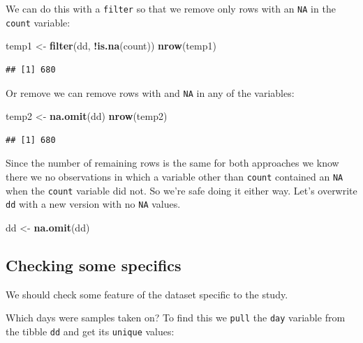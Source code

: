 \documentclass[]{book}
\newenvironment{Shaded}{\begin{snugshade}}{\end{snugshade}}
\newcommand{\KeywordTok}[1]{\textcolor[rgb]{0.13,0.29,0.53}{\textbf{#1}}}
\newcommand{\NormalTok}[1]{#1}
\newcommand{\OperatorTok}[1]{\textcolor[rgb]{0.81,0.36,0.00}{\textbf{#1}}}
\newcommand{\StringTok}[1]{\textcolor[rgb]{0.31,0.60,0.02}{#1}}
\begin{document}
We can do this with a \texttt{filter} so that we remove only rows with an \texttt{NA} in the \texttt{count} variable:

\begin{Shaded}
\begin{Highlighting}[]
\NormalTok{temp1 <-}\StringTok{ }\KeywordTok{filter}\NormalTok{(dd, }\OperatorTok{!}\KeywordTok{is.na}\NormalTok{(count))}
\KeywordTok{nrow}\NormalTok{(temp1)}
\end{Highlighting}
\end{Shaded}

\begin{verbatim}
## [1] 680
\end{verbatim}

Or remove we can remove rows with and \texttt{NA} in any of the variables:

\begin{Shaded}
\begin{Highlighting}[]
\NormalTok{temp2 <-}\StringTok{ }\KeywordTok{na.omit}\NormalTok{(dd)}
\KeywordTok{nrow}\NormalTok{(temp2)}
\end{Highlighting}
\end{Shaded}

\begin{verbatim}
## [1] 680
\end{verbatim}

Since the number of remaining rows is the same for both approaches we know there we no observations in which a variable other than \texttt{count} contained an \texttt{NA} when the \texttt{count} variable did not. So we're safe doing it either way. Let's overwrite \texttt{dd} with a new version with no \texttt{NA} values.

\begin{Shaded}
\begin{Highlighting}[]
\NormalTok{dd <-}\StringTok{ }\KeywordTok{na.omit}\NormalTok{(dd)}
\end{Highlighting}
\end{Shaded}

\hypertarget{checking-some-specifics}{%
\subsection{Checking some specifics}\label{checking-some-specifics}}

We should check some feature of the dataset specific to the study.

Which days were samples taken on? To find this we \texttt{pull} the \texttt{day} variable from the tibble \texttt{dd} and get its \texttt{unique} values:
\end{document}
